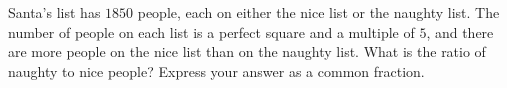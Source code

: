 Santa's list has $1850$ people, each on either the nice list or the naughty list. The number of people on each list is a perfect square and a multiple of $5$, and there are more people on the nice list than on the naughty list. What is the ratio of naughty to nice people? Express your answer as a common fraction.
